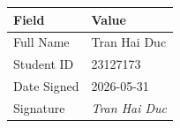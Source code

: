 \documentclass[12pt, a4paper]{article}
\begin{document}
\vspace{1.5cm}

\begin{table}[h!]
\centering
\begin{tabularx}{\textwidth}{@{} L{4cm} X @{}}
\toprule
{}
\textbf{Field} & \textbf{Value} \\
\midrule
Full Name   & Tran Hai Duc \\
Student ID  & 23127173 \\
Date Signed & 2026-05-31 \\
Signature   & \textit{Tran Hai Duc} \\
\bottomrule
\end{tabularx}
\end{table}
\end{document}
